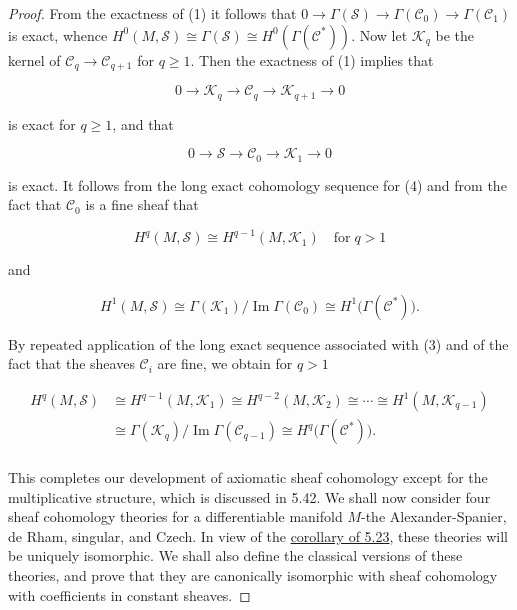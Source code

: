 \begin{proof}
From the exactness of (1) it follows that $0 \to \Gamma(\mathcal{S}) \to \Gamma(\mathcal{C}_0) \to \Gamma(\mathcal{C}_1)$ is exact, whence $H^0(M,\mathcal{S}) \cong \Gamma(\mathcal{S}) \cong H^0\left(\Gamma(\mathcal{C}^*)\right)$. Now let $\mathcal{K}_q$ be the kernel of $\mathcal{C}_q \to \mathcal{C}_{q+1}$ for $q \geq 1$. Then the exactness of (1) implies that

\[
0\to\mathcal{K}_{q}\to\mathcal{C}_{q}\to\mathcal{K}_{q+1}\to0
\]

is exact for  $ q \geq 1 $, and that

\begin{equation}
\tag{3}\label{eq:5.25:3}
0\to\mathcal{S}\to\mathcal{C}_{0}\to\mathcal{K}_{1}\to0
\end{equation}

is exact. It follows from the long exact cohomology sequence for (4) and from the fact that  $ \mathcal{C}_{0} $ is a fine sheaf that

\begin{equation}
\tag{4}\label{eq:5.25:4}
H^{q}(M,\mathcal{S})\cong H^{q-1}(M,\mathcal{K}_{1})\quad\mathrm{for}\;q>1
\end{equation}

and

\begin{equation}
\tag{5}\label{eq:5.25:5}
H^{1}(M,\mathcal{S})\cong\Gamma(\mathcal{K}_{1})/\operatorname{Im}\Gamma(\mathcal{C}_{0})\cong H^{1}\big(\Gamma(\mathcal{C}^{*})\big).
\end{equation}

By repeated application of the long exact sequence associated with (3) and of the fact that the sheaves  $ \mathcal{C}_i $ are fine, we obtain for  $ q > 1 $

\begin{equation}
\tag{6}\label{eq:5.25:6}
\begin{aligned}{H^{q}(M,\mathcal{S})}&{{}\cong H^{q-1}(M,\mathcal{K}_{1})\cong H^{q-2}(M,\mathcal{K}_{2})\cong\cdots\cong H^{1}(M,\mathcal{K}_{q-1})}\\ {}&{{}\cong\Gamma(\mathcal{K}_{q})/\operatorname{Im}\Gamma(\mathcal{C}_{q-1})\cong H^{q}\bigl(\Gamma(\mathcal{C}^{*})\bigr).}\\ \end{aligned}
\end{equation}

This completes our development of axiomatic sheaf cohomology except for the multiplicative structure, which is discussed in 5.42. We shall now consider four sheaf cohomology theories for a differentiable manifold $M$-the Alexander-Spanier, de Rham, singular, and Czech. In view of the \hyperref[thm:5.23]{corollary of 5.23}, these theories will be uniquely isomorphic. We shall also define the classical versions of these theories, and prove that they are canonically isomorphic with sheaf cohomology with coefficients in constant sheaves.

\end{proof}

